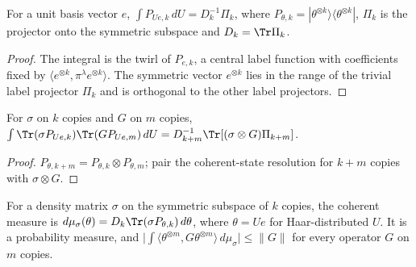 \begin{theorem}
    \label{thm:coherent_resolution}
    \leanok
    For a unit basis vector $e$, $\int P_{Ue,k}\,dU=D_k^{-1}\Pi_k$, where
    $P_{\theta,k}=|\theta^{\otimes k}\rangle\langle\theta^{\otimes k}|$, $\Pi_k$ is the
    projector onto the symmetric subspace and $D_k=\Tr\Pi_k$.
\end{theorem}

\begin{proof}\leanok
    The integral is the twirl of $P_{e,k}$, a central label function with coefficients
    fixed by $\langle e^{\otimes k},\pi^\lambda e^{\otimes k}\rangle$. The symmetric vector
    $e^{\otimes k}$ lies in the range of the trivial label projector $\Pi_k$ and is
    orthogonal to the other label projectors.
\end{proof}

\begin{theorem}
    \label{thm:finite_husimi_identity}
    \leanok
    For $\sigma$ on $k$ copies and $G$ on $m$ copies,
    $\int\Tr(\sigma P_{Ue,k})\Tr(GP_{Ue,m})\,dU=D_{k+m}^{-1}\Tr[(\sigma\otimes G)\Pi_{k+m}]$.
\end{theorem}

\begin{proof}\leanok
    $P_{\theta,k+m}=P_{\theta,k}\otimes P_{\theta,m}$; pair the coherent-state resolution
    for $k+m$ copies with $\sigma\otimes G$.
\end{proof}

\begin{definition}
    \label{def:coherent_measure}
    \leanok
    For a density matrix $\sigma$ on the symmetric subspace of $k$ copies, the coherent
    measure is $d\mu_\sigma(\theta)=D_k\Tr(\sigma P_{\theta,k})\,d\theta$, where $\theta=Ue$
    for Haar-distributed $U$. It is a probability measure, and
    $\bigl|\int\langle\theta^{\otimes m},G\theta^{\otimes m}\rangle\,d\mu_\sigma\bigr|\le\|G\|$
    for every operator $G$ on $m$ copies.
\end{definition}

